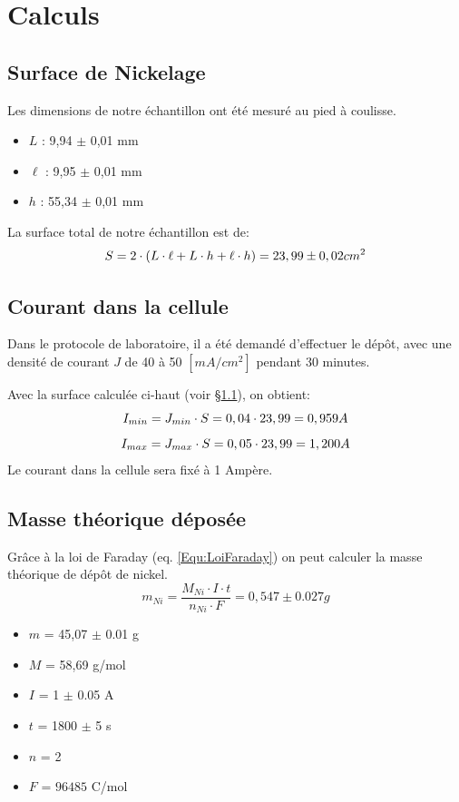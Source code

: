 \section{Calculs}

\subsection{Surface de Nickelage}
\label{sec:SurfNick}
Les dimensions de notre échantillon ont été mesuré au pied à coulisse.
\begin{itemize}
    \item $L$ : 9,94 $\pm$ 0,01 mm
    \item $\ell$ : 9,95 $\pm$ 0,01 mm
    \item $h$ : 55,34 $\pm$ 0,01 mm
  \end{itemize} 
La surface total de notre échantillon est de: 
\begin{equation}
    S = 2 \cdot (L \cdot \ell + L \cdot h + \ell \cdot h) = 23,99 \pm 0,02 \space cm^2
\end{equation}

\subsection{Courant dans la cellule}
Dans le protocole de laboratoire, il a été demandé d'effectuer le dépôt,
avec une densité de courant $J$ de 40 à 50 $[mA/cm^2]$ pendant 30 minutes.

\vspace{0.3cm}

Avec la surface calculée ci-haut (voir §\ref{sec:SurfNick}), on obtient:
\begin{equation}
    I_{min} = J_{min} \cdot S = 0,04 \cdot 23,99 = 0,959 \space A
\end{equation}
\begin{equation}
    I_{max} = J_{max} \cdot S = 0,05 \cdot 23,99 = 1,200 \space A
\end{equation}
Le courant dans la cellule sera fixé à 1 Ampère.

\subsection{Masse théorique déposée}
Grâce à la loi de Faraday (eq. \ref{Equ:LoiFaraday}) on peut calculer la masse théorique
de dépôt de nickel.
    \begin{equation}
        m_{Ni} = \frac{M_{Ni} \cdot I \cdot t}{n_{Ni} \cdot F} = 0,547 \pm 0.027 g
    \end{equation}
    \begin{itemize}
        \item $m$ = 45,07 $\pm$ 0.01 g
        \item $M$ = 58,69 g/mol
        \item $I$ = 1 $\pm$ 0.05 A 
        \item $t$ = 1800 $\pm$ 5 s
        \item $n$ = 2
        \item $F$ = $96485$ C/mol
    \end{itemize}
